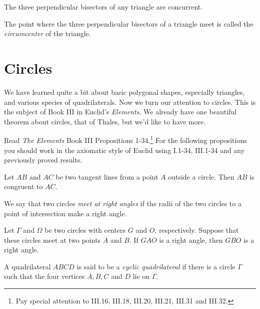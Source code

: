 \begin{conjecture}\label{conj:circumcenter}
The three perpendicular bisectors of any triangle are concurrent.
\end{conjecture}

\begin{definition}\label{defn:circumcenter}
The point where the three perpendicular bisectors of a triangle meet is called the \emph{circumcenter} of the triangle.
\end{definition}




\chapter{Circles}

We have learned quite a bit about basic polygonal shapes, especially triangles, and various species of quadrilaterals. Now we turn our attention to circles. This is the subject of Book III in Euclid's \emph{Elements}. We already have one beautiful theorem about circles, that of Thales, but we'd like to have more.


Read \emph{The Elements} Book III Propositions 1-34.\footnote{Pay special attention to III.16, III.18, III.20, III.21, III.31 and III.32.}
For the following propositions you should work in the axiomatic style of Euclid using I.1-34,  III.1-34 and any previously proved results.



\begin{conjecture}\label{conj:tangents-to-circle}
Let $AB$ and $AC$ be two tangent lines from a point $A$ outside a circle. Then $AB$ is congruent to $AC$.
\end{conjecture}

\begin{definition}\label{defn:circles-perp}
We say that two circles \emph{meet at right angles} if the radii of the two circles to a point of intersection make a right angle.
\end{definition}

\begin{conjecture}\label{conj:perp-circles}
Let $\Gamma$ and $\Omega$ be two circles with centers $G$ and $O$, respectively. Suppose that these circles meet at two points $A$ and $B$. If $GAO$ is a right angle, then $GBO$ is a right angle.
\end{conjecture}


\begin{definition}\label{defn:cyclic-quad}
A quadrilateral $ABCD$ is said to be a \emph{cyclic quadrilateral} if there is a circle $\Gamma$ such that the four vertices $A,B,C$ and $D$ lie on $\Gamma$.
\end{definition}

